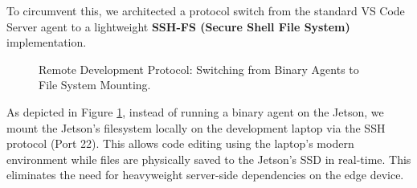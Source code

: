 To circumvent this, we architected a protocol switch from the standard VS Code Server agent to a lightweight \textbf{SSH-FS (Secure Shell File System)} implementation.

\vspace{0.5cm}

\begin{figure}[htbp]
	\centering
	
	\caption{Remote Development Protocol: Switching from Binary Agents to File System Mounting.}
	\label{fig:remote_protocol}
\end{figure}

As depicted in Figure \ref{fig:remote_protocol}, instead of running a binary agent on the Jetson, we mount the Jetson's filesystem locally on the development laptop via the SSH protocol (Port 22). This allows code editing using the laptop's modern environment while files are physically saved to the Jetson's SSD in real-time. This eliminates the need for heavyweight server-side dependencies on the edge device.